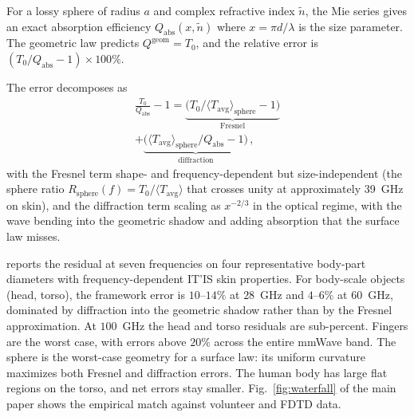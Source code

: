 \documentclass[journal,twocolumn,10pt]{IEEEtran}
\theoremstyle{plain}
\theoremstyle{remark}
\newcommand{\Tavg}{T_{\mathrm{avg}}}
\newcommand{\ntilde}{\tilde{n}}
\begin{document}
For a lossy sphere of radius $a$ and complex refractive index
$\ntilde$, the Mie series gives an exact absorption efficiency
$Q_{\mathrm{abs}}(x, \ntilde)$ where $x = \pi d/\lambda$ is the size
parameter. The geometric law predicts $Q^{\mathrm{geom}} = T_0$, and
the relative error is $(T_0/Q_{\mathrm{abs}} - 1)\times 100\%$.

The error decomposes as
\begin{multline}\label{eq:mie-error-decomp}
  \frac{T_0}{Q_{\mathrm{abs}}} - 1
  = \underbrace{\bigl(T_0/\langle\Tavg\rangle_{\mathrm{sphere}}
    - 1\bigr)}_{\mathrm{Fresnel}}\\
    + \underbrace{\bigl(\langle\Tavg\rangle_{\mathrm{sphere}}
    /Q_{\mathrm{abs}} - 1\bigr)}_{\mathrm{diffraction}}\, ,
\end{multline}
with the Fresnel term shape- and frequency-dependent but
size-independent (the sphere ratio $R_{\mathrm{sphere}}(f) =
T_0/\langle\Tavg\rangle$ that crosses unity at approximately 39~GHz on
skin), and the diffraction term scaling as $x^{-2/3}$ in the optical
regime, with the wave bending into the geometric shadow and adding
absorption that the surface law misses.

 reports the residual at seven frequencies on
four representative body-part diameters with frequency-dependent
IT'IS skin properties. For body-scale objects (head, torso), the
framework error is $10$--$14\%$ at $28$~GHz and $4$--$6\%$ at
$60$~GHz, dominated by diffraction into the geometric shadow rather
than by the Fresnel approximation. At $100$~GHz the head and torso
residuals are sub-percent. Fingers are the worst case, with errors
above $20\%$ across the entire mmWave band. The sphere is the
worst-case geometry for a surface law: its uniform curvature
maximizes both Fresnel and diffraction errors. The human body has
large flat regions on the torso, and net errors stay smaller.
Fig.~\ref{fig:waterfall} of the main paper shows the empirical
match against volunteer and FDTD data.
\end{document}
